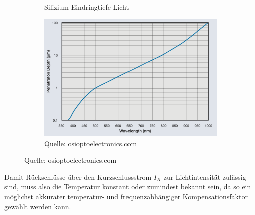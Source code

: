 \begin{figure}[H]
\begin{subfigure}[b]{0.6\textwidth}
    \caption{Silizium-Eindringtiefe-Licht}
    \includegraphics[width=\textwidth]{img/Silizium-Eindringtiefe-Licht.png}
    \caption*{Quelle: osioptoelectronics.com}
  \label{fig:Silizium-eindingtiefe}
  \end{subfigure}
\end{figure}







\noindent Damit Rückschlüsse über den Kurzschlussstrom $I_K$ zur Lichtintensität zulässig sind, muss also die Temperatur konstant oder zumindest bekannt sein, da so ein möglichst akkurater temperatur- und frequenzabhängiger Kompensationsfaktor gewählt werden kann.
